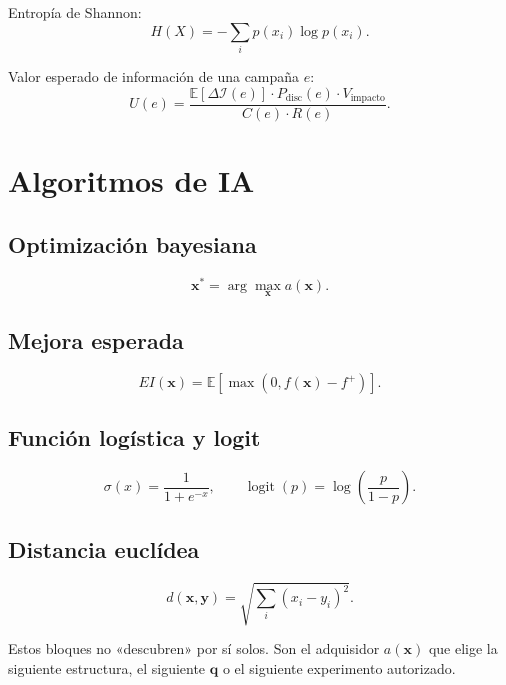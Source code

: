 \documentclass[11pt,a4paper]{article}
\begin{document}
Entropía de Shannon:
\begin{equation}
H(X)
=
-
\sum_i p(x_i)\log p(x_i).
\end{equation}

Valor esperado de información de una campaña $e$:
\begin{equation}
U(e)
=
\frac{
\mathbb{E}[\Delta \mathcal{I}(e)]\cdot P_{\mathrm{disc}}(e)\cdot V_{\mathrm{impacto}}
}{
C(e)\cdot R(e)
}.
\end{equation}

\section{Algoritmos de IA}

\subsection{Optimización bayesiana}
\begin{equation}
\mathbf{x}^{*}
=
\arg\max_{\mathbf{x}} a(\mathbf{x}).
\end{equation}

\subsection{Mejora esperada}
\begin{equation}
EI(\mathbf{x})
=
\mathbb{E}\left[\max(0,f(\mathbf{x})-f^{+})\right].
\end{equation}

\subsection{Función logística y logit}
\begin{equation}
\sigma(x)=\frac{1}{1+e^{-x}},\qquad
\operatorname{logit}(p)=\log\left(\frac{p}{1-p}\right).
\end{equation}

\subsection{Distancia euclídea}
\begin{equation}
d(\mathbf{x},\mathbf{y})
=
\sqrt{\sum_i (x_i-y_i)^2}.
\end{equation}

Estos bloques no «descubren» por sí solos. Son el adquisidor $a(\mathbf{x})$ que elige la siguiente estructura, el siguiente $\mathbf{q}$ o el siguiente experimento autorizado.
\end{document}
